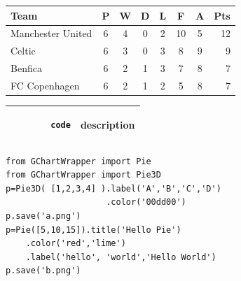 \documentclass{ctexart}
\begin{document}
\begin{CJK*}{GBK}{song}
\begin{tabular}{l*{6}{c}r}
Team              & P & W & D & L & F  & A & Pts \\
\hline
Manchester United & 6 & 4 & 0 & 2 & 10 & 5 & 12  \\
Celtic            & 6 & 3 & 0 & 3 &  8 & 9 &  9  \\
Benfica           & 6 & 2 & 1 & 3 &  7 & 8 &  7  \\
FC Copenhagen     & 6 & 2 & 1 & 2 &  5 & 8 &  7  \\
\end{tabular}


\begin{tabular}{| p{5cm} | c |}
        \hline
        \begin{verbatim}
        code
        \end{verbatim}
        & description
        \\ \hline
\end{tabular}

\begin{lstlisting}[frame=trBL]
from GChartWrapper import Pie
from GChartWrapper import Pie3D
p=Pie3D( [1,2,3,4] ).label('A','B','C','D')
                    .color('00dd00')
p.save('a.png')
p=Pie([5,10,15]).title('Hello Pie')
    .color('red','lime')
    .label('hello', 'world','Hello World')
p.save('b.png')
\end{lstlisting}

\end{CJK*}
\end{document}
